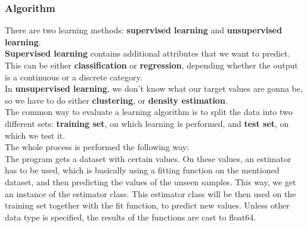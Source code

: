 \documentclass[a4paper,10pt]{article}
\newcommand\tab[1][0.5cm]{\hspace*{#1}}
\begin{document}
  \subsubsection{Algorithm}
\tab There are two learning methods: \textbf{supervised learning} and \textbf{unsupervised learning}. \\
\tab \textbf{Supervised learning} contains additional attributes that we want to predict. This can be either \textbf{classification} or \textbf{regression}, depending whether the output is a continuous or a discrete category. \\
 \tab In \textbf{unsupervised learning}, we don't know what our target values are gonna be, so we have to do either \textbf{clustering}, or \textbf{density estimation}. \\ 
 \tab The common way to evaluate a learning algorithm is to split the data into two different sets: \textbf{training set}, on which learning is performed, and \textbf{test set}, on which we test it. \\
 \tab The whole process is performed the following way: \\ 
 \tab The program gets a dataset with certain values. On these values, an estimator has to be used, which is basically using a fitting function on the mentioned dataset, and then predicting the values of the unseen samples. This way, we get an instance of the estimator class. This estimator class will be then used on the training set together with the fit function, to predict new values. Unless other data type is specified, the results of the functions are cast to {\selectfont float64}.
 
\end{document}
